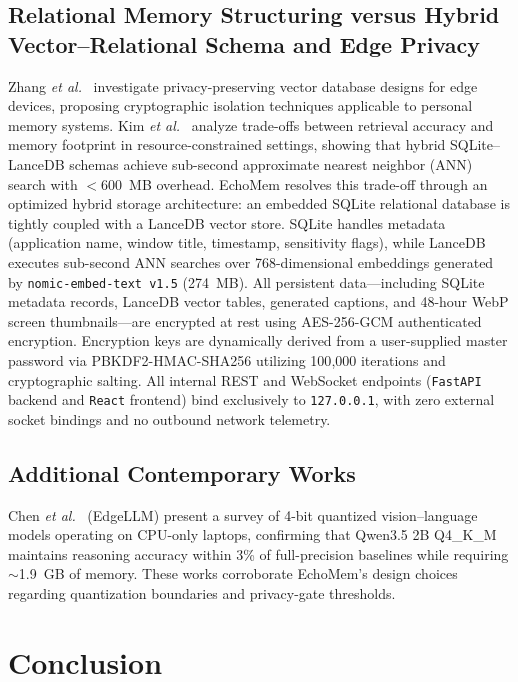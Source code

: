 \documentclass[conference]{IEEEtran}
\newcommand{\code}[1]{\texttt{#1}}
\begin{document}
\subsection{Relational Memory Structuring versus Hybrid Vector--Relational
Schema and Edge Privacy}

Zhang \textit{et al.}~\cite{zhang2024privvec} investigate privacy-preserving
vector database designs for edge devices, proposing cryptographic isolation
techniques applicable to personal memory systems. Kim \textit{et
al.}~\cite{kim2023ondevicerag} analyze trade-offs between retrieval accuracy and
memory footprint in resource-constrained settings, showing that hybrid
SQLite--LanceDB schemas achieve sub-second approximate nearest neighbor (ANN)
search with $<600$~MB overhead. EchoMem resolves this trade-off through an
optimized hybrid storage architecture: an embedded SQLite relational database is
tightly coupled with a LanceDB vector store. SQLite handles metadata
(application name, window title, timestamp, sensitivity flags), while LanceDB
executes sub-second ANN searches over 768-dimensional embeddings generated by
\code{nomic-embed-text v1.5} (274~MB). All persistent data---including SQLite
metadata records, LanceDB vector tables, generated captions, and 48-hour WebP
screen thumbnails---are encrypted at rest using AES-256-GCM authenticated
encryption. Encryption keys are dynamically derived from a user-supplied master
password via PBKDF2-HMAC-SHA256 utilizing 100{,}000 iterations and cryptographic
salting. All internal REST and WebSocket endpoints (\code{FastAPI} backend and
\code{React} frontend) bind exclusively to \code{127.0.0.1}, with zero external
socket bindings and no outbound network telemetry.

\subsection{Additional Contemporary Works}

Chen \textit{et al.}~\cite{chen2023edgellm} (EdgeLLM) present a survey of 4-bit
quantized vision--language models operating on CPU-only laptops, confirming that
Qwen3.5 2B Q4\_K\_M maintains reasoning accuracy within 3\% of full-precision
baselines while requiring $\sim$1.9~GB of memory. These works corroborate
EchoMem's design choices regarding quantization boundaries and privacy-gate
thresholds.

\section{Conclusion}
\end{document}
